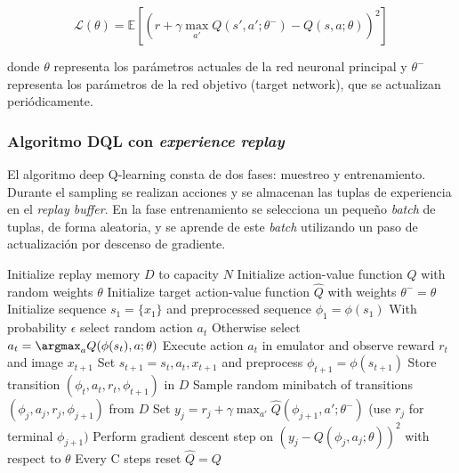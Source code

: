 \begin{equation}
\mathcal{L}(\theta) = \mathbb{E} \left[ \left( r + \gamma \max_{a'} Q(s', a'; \theta^{-}) - Q(s, a; \theta) \right)^2 \right]
\end{equation}

donde \(\theta\) representa los parámetros actuales de la red neuronal principal y \(\theta^{-}\) representa los parámetros de la red objetivo (target network), que se actualizan periódicamente.

\subsubsection{Algoritmo DQL con \textit{experience replay}}
El algoritmo deep Q-learning consta de dos fases: muestreo y entrenamiento. Durante el sampling se realizan acciones y se almacenan las tuplas de experiencia en el \textit{replay buffer}. En la fase entrenamiento se selecciona un pequeño \textit{batch} de tuplas, de forma aleatoria, y se aprende de este \textit{batch} utilizando un paso de actualización por descenso de gradiente.

\begin{algorithm}
    \caption{Deep Q-Network with Experience Replay} 
    \begin{algorithmic}[1]
        \State Initialize replay memory $D$ to capacity $N$
        \State Initialize action-value function $Q$ with random weights $\theta$
        \State Initialize target action-value function $\hat{Q}$ with weights $\theta^- = \theta$
            \State Initialize sequence $s_1 = \{x_1\}$ and preprocessed sequence $\phi_1 = \phi(s_1)$
                \State With probability $\epsilon$ select random action $a_t$
                \State Otherwise select $a_t = \argmax_a Q(\phi(s_t), a; \theta)$
                \State Execute action $a_t$ in emulator and observe reward $r_t$ and image $x_{t+1}$
                \State Set $s_{t+1} = s_t, a_t, x_{t+1}$ and preprocess $\phi_{t+1} = \phi(s_{t+1})$
                \State Store transition $(\phi_t, a_t, r_t, \phi_{t+1})$ in $D$
                \State Sample random minibatch of transitions $(\phi_j, a_j, r_j, \phi_{j+1})$ from $D$
                \State Set $y_j = r_j + \gamma \max_{a'} \hat{Q}(\phi_{j+1}, a'; \theta^-)$ (use $r_j$ for terminal $\phi_{j+1})$
                \State Perform gradient descent step on $(y_j - Q(\phi_j, a_j; \theta))^2$ with respect to $\theta$
                \State Every C steps reset $\hat{Q} = Q$
            \EndFor
        \EndFor
    \end{algorithmic} 
\end{algorithm}

